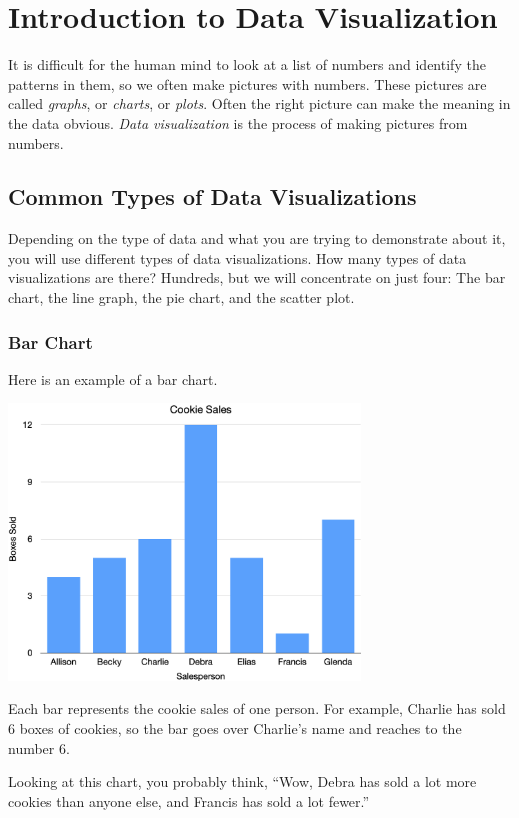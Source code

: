 \chapter{Introduction to Data Visualization}

It is difficult for the human mind to look at a list of numbers and
identify the patterns in them, so we often make pictures with
numbers. These pictures are called \textit{graphs}, or
\textit{charts}, or \textit{plots}. Often the right picture can make
the meaning in the data obvious. \textit{Data visualization} is the
process of making pictures from numbers.

\section{Common Types of Data Visualizations}

Depending on the type of data and what you are trying to demonstrate
about it, you will use different types of data visualizations.  How
many types of data visualizations are there? Hundreds, but we will
concentrate on just four: The bar chart, the line graph, the pie
chart, and the scatter plot.

\subsection{Bar Chart}

Here is an example of a bar chart.

\includegraphics[width=0.7\textwidth]{CookieChart.png}

Each bar represents the cookie sales of one person.  For example,
Charlie has sold 6 boxes of cookies, so the bar goes over Charlie's
name and reaches to the number 6.

Looking at this chart, you probably think, ``Wow, Debra has sold a lot
more cookies than anyone else, and Francis has sold a lot fewer.''

